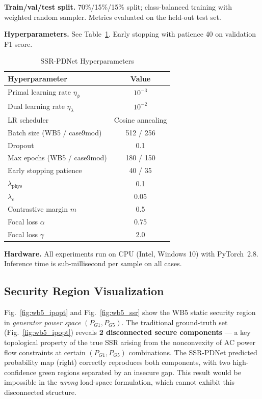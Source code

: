 \documentclass[journal]{IEEEtran}
\begin{document}
\textbf{Train/val/test split.} 70\%/15\%/15\% split; class-balanced training
with weighted random sampler. Metrics evaluated on the held-out test set.

\textbf{Hyperparameters.} See Table~\ref{tab:hparams}. Early stopping with
patience 40 on validation F1 score.

\begin{table}[!t]
  \centering
  \caption{SSR-PDNet Hyperparameters}
  \label{tab:hparams}
  \begin{tabular}{lc}
    \toprule
    Hyperparameter & Value \\
    \midrule
    Primal learning rate $\eta_\phi$ & $10^{-3}$ \\
    Dual learning rate $\eta_\lambda$ & $10^{-2}$ \\
    LR scheduler & Cosine annealing \\
    Batch size (WB5 / case9mod) & 512 / 256 \\
    Dropout & 0.1 \\
    Max epochs (WB5 / case9mod) & 180 / 150 \\
    Early stopping patience & 40 / 35 \\
    $\lambda_{\mathrm{phys}}$ & 0.1 \\
    $\lambda_c$ & 0.05 \\
    Contrastive margin $m$ & 0.5 \\
    Focal loss $\alpha$ & 0.75 \\
    Focal loss $\gamma$ & 2.0 \\
    \bottomrule
  \end{tabular}
\end{table}

\textbf{Hardware.} All experiments run on CPU (Intel, Windows 10) with
PyTorch~2.8. Inference time is sub-millisecond per sample on all cases.

\subsection{Security Region Visualization}

Fig.~\ref{fig:wb5_ipopt} and Fig.~\ref{fig:wb5_ssr} show the WB5 static security region in \emph{generator
power space} $(P_{G1}, P_{G5})$. The traditional ground-truth set (Fig.~\ref{fig:wb5_ipopt}) reveals
\textbf{2 disconnected secure components} — a key topological property of the
true SSR arising from the nonconvexity of AC power flow constraints at certain
$(P_{G1}, P_{G5})$ combinations. The SSR-PDNet predicted probability map (right)
correctly reproduces both components, with two high-confidence green regions
separated by an insecure gap. This result would be impossible in the
\emph{wrong} load-space formulation, which cannot exhibit this disconnected structure.
\end{document}
